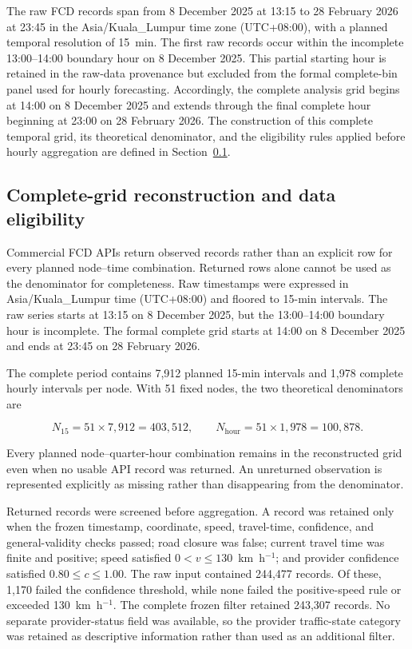 \documentclass[pdflatex,sn-basic,Numbered]{sn-jnl}
\begin{document}
The raw FCD records span from 8 December 2025 at 13:15 to 28 February 2026 at 23:45 in the Asia/Kuala\_Lumpur time zone (UTC+08:00), with a planned temporal resolution of 15~min. The first raw records occur within the incomplete 13:00--14:00 boundary hour on 8 December 2025. This partial starting hour is retained in the raw-data provenance but excluded from the formal complete-bin panel used for hourly forecasting. Accordingly, the complete analysis grid begins at 14:00 on 8 December 2025 and extends through the final complete hour beginning at 23:00 on 28 February 2026. The construction of this complete temporal grid, its theoretical denominator, and the eligibility rules applied before hourly aggregation are defined in Section~\ref{subsec:eligibility}.

\subsection{Complete-grid reconstruction and data eligibility}
\label{subsec:eligibility}

Commercial FCD APIs return observed records rather than an explicit row for every planned node--time combination. Returned rows alone cannot be used as the denominator for completeness. Raw timestamps were expressed in Asia/Kuala\_Lumpur time (UTC+08:00) and floored to 15-min intervals. The raw series starts at 13:15 on 8 December 2025, but the 13:00--14:00 boundary hour is incomplete. The formal complete grid starts at 14:00 on 8 December 2025 and ends at 23:45 on 28 February 2026.

The complete period contains 7,912 planned 15-min intervals and 1,978 complete hourly intervals per node. With 51 fixed nodes, the two theoretical denominators are

\begin{equation}
N_{15}=51\times7{,}912=403{,}512,
\qquad
N_{\mathrm{hour}}=51\times1{,}978=100{,}878.
\label{eq:grid_denominators}
\end{equation}

Every planned node--quarter-hour combination remains in the reconstructed grid even when no usable API record was returned. An unreturned observation is represented explicitly as missing rather than disappearing from the denominator.

Returned records were screened before aggregation. A record was retained only when the frozen timestamp, coordinate, speed, travel-time, confidence, and general-validity checks passed; road closure was false; current travel time was finite and positive; speed satisfied $0<v\leq130$~km~h$^{-1}$; and provider confidence satisfied $0.80\leq c\leq1.00$. The raw input contained 244,477 records. Of these, 1,170 failed the confidence threshold, while none failed the positive-speed rule or exceeded 130~km~h$^{-1}$. The complete frozen filter retained 243,307 records. No separate provider-status field was available, so the provider traffic-state category was retained as descriptive information rather than used as an additional filter.
\end{document}
